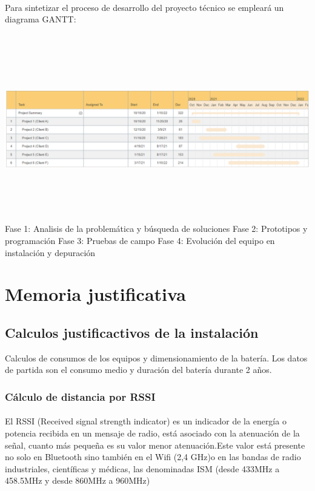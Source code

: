 \documentclass[a4paper ,12pt, onecolumn]{article}
\begin{document}
        \paragraph{}
        Para sintetizar el proceso de desarrollo del proyecto técnico se empleará un diagrama GANTT: 
        \paragraph{}
        \includegraphics[width=15cm, height=8cm]{gantt.PNG}
        Fase 1: Analisis de la problemática y búsqueda de soluciones
        Fase 2: Prototipos y programación
        Fase 3: Pruebas de campo
        Fase 4: Evolución del equipo en instalación y depuración 
\section{Memoria justificativa}
    \subsection{Calculos justificactivos de la instalación}
        Calculos de consumos de los equipos y dimensionamiento de la batería.
        Los datos de partida son el consumo medio y duración del batería durante 2 años.
        \subsubsection{ Cálculo de distancia por RSSI}
            \paragraph{}
            El RSSI (Received signal strength indicator) es un indicador de la energía o potencia recibida en un mensaje de radio, 
            está asociado con la atenuación de la señal, cuanto más pequeña es su valor menor atenuación.Este valor está 
            presente no solo en Bluetooth sino también en el Wifi (2,4 GHz)o en las bandas de radio industriales, científicas y médicas,
            las denominadas ISM (desde 433MHz a 458.5MHz y desde 860MHz a 960MHz)
\end{document}
